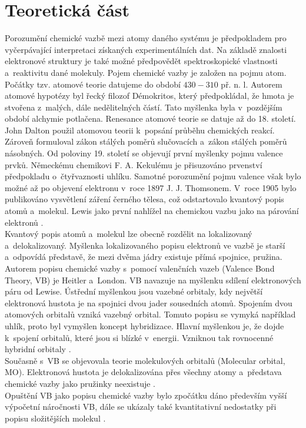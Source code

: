 \documentclass[
  printed, %
  table,   %
  lof,     %
  lot,     %
  oneside,
]{fithesis3}
\begin{document}
\chapter{Teoretická část}
Porozumění chemické vazbě mezi atomy daného systému je předpokladem pro vyčerpávající interpretaci získaných experimentálních dat. Na základě znalosti elektronové struktury je také možné předpovědět spektroskopické vlastnosti a~reaktivitu dané molekuly. Pojem chemické vazby je založen na pojmu atom. Počátky tzv. atomové teorie datujeme do období $430-310$ př. n. l. Autorem atomové hypotézy byl řecký filozof Démokritos, který předpokládal, že hmota je stvořena z~malých, dále nedělitelných částí. Tato myšlenka byla v~pozdějším období alchymie potlačena. Renesance atomové teorie se datuje až do 18. století. John Dalton použil atomovou teorii k~popsání průběhu chemických reakcí. Zároveň formuloval zákon stálých poměrů slučovacích a~zákon stálých poměrů násobných. Od poloviny 19. století se objevují první myšlenky pojmu valence prvků. Německému chemikovi F. A. Kekulému je přisuzováno prvenství předpokladu o~čtyřvaznosti uhlíku. Samotné porozumění pojmu valence však bylo možné až po objevení elektronu v~roce 1897 J. J. Thomsonem. V~roce 1905 bylo publikováno vysvětlení záření černého tělesa, což odstartovalo kvantový popis atomů a~molekul. Lewis jako první nahlížel na chemickou vazbu jako na párování elektronů \cite{Munzarova1996thesis}. \\
Kvantový popis atomů a~molekul lze obecně rozdělit na lokalizovaný a~delokalizovaný. Myšlenka lokalizovaného popisu elektronů ve vazbě je starší a~odpovídá představě, že mezi dvěma jádry existuje přímá spojnice, pružina. Autorem popisu chemické vazby s~pomocí valenčních vazeb (Valence Bond Theory, VB) je Heitler a~London. VB navazuje na myšlenku sdílení elektronových páru od Lewise. Ústřední myšlenkou jsou vazebné orbitaly, kdy největší elektronová hustota je na spojnici dvou jader sousedních atomů. Spojením dvou atomových orbitalů vzniká vazebný orbital. Tomuto popisu se vymyká například uhlík, proto byl vymyšlen koncept hybridizace. Hlavní myšlenkou je, že dojde k~spojení orbitalů, které jsou si blízké v~energii. Vzniknou tak rovnocenné hybridní orbitaly \cite{Munzarova1996thesis}. \\
Současně s~VB se objevovala teorie molekulových orbitalů (Molecular orbital, MO). Elektronová hustota je delokalizována přes všechny atomy a~představa chemické vazby jako pružinky neexistuje \cite{Munzarova1996thesis}. \\
Opuštění VB jako popisu chemické vazby bylo zpočátku dáno především vyšší výpočetní náročnosti VB, dále se ukázaly také kvantitativní nedostatky při popisu složitějších molekul \cite{lowe2011quantum}.
\end{document}
